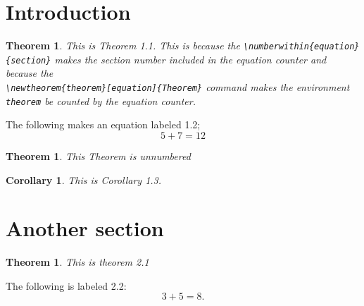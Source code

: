 \documentclass{amsart}
\numberwithin{equation}{section}
\theoremstyle{plain}
\newtheorem*{theorem*}{Theorem}
\newtheorem{theorem}[equation]{Theorem}
\newtheorem{corollary}[equation]{Corollary}
\theoremstyle{definition}
\theoremstyle{remark}
\begin{document}
\section{Introduction}

\begin{theorem}
This is Theorem 1.1. This is because the \verb|\numberwithin{equation}{section}| makes the section number included in the equation counter and because the \\
\verb|\newtheorem{theorem}[equation]{Theorem}| command makes the environment \verb|theorem| be counted by the equation counter.
\end{theorem}

The following makes an equation labeled 1.2; 
\begin{equation}
5 + 7 = 12
\end{equation}

\begin{theorem*}
This Theorem is unnumbered
\end{theorem*}

\begin{corollary}
This is Corollary 1.3.
\end{corollary}

\section{Another section}
\begin{theorem}
This is theorem 2.1
\end{theorem}

The following is labeled 2.2:
\begin{equation}
3+5 = 8.
\end{equation}
\end{document}
